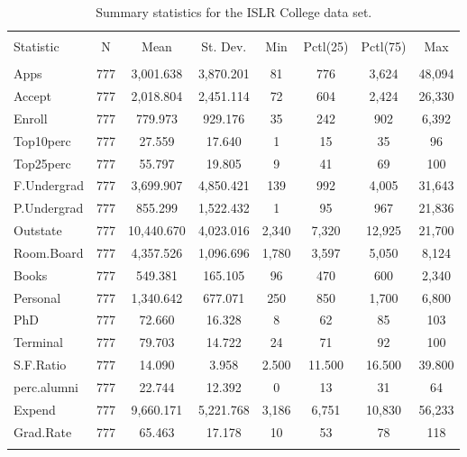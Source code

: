 \documentclass{article}\usepackage[]{graphicx}\usepackage[]{color}
\begin{document}
\begin{table}[!htbp] \centering 
  \caption{Summary statistics for the ISLR College data set.} 
  \label{descrips} 
\begin{tabular}{@{\extracolsep{5pt}}lccccccc} 
\\[-1.8ex]\hline 
\hline \\[-1.8ex] 
Statistic & \multicolumn{1}{c}{N} & \multicolumn{1}{c}{Mean} & \multicolumn{1}{c}{St. Dev.} & \multicolumn{1}{c}{Min} & \multicolumn{1}{c}{Pctl(25)} & \multicolumn{1}{c}{Pctl(75)} & \multicolumn{1}{c}{Max} \\ 
\hline \\[-1.8ex] 
Apps & 777 & 3,001.638 & 3,870.201 & 81 & 776 & 3,624 & 48,094 \\ 
Accept & 777 & 2,018.804 & 2,451.114 & 72 & 604 & 2,424 & 26,330 \\ 
Enroll & 777 & 779.973 & 929.176 & 35 & 242 & 902 & 6,392 \\ 
Top10perc & 777 & 27.559 & 17.640 & 1 & 15 & 35 & 96 \\ 
Top25perc & 777 & 55.797 & 19.805 & 9 & 41 & 69 & 100 \\ 
F.Undergrad & 777 & 3,699.907 & 4,850.421 & 139 & 992 & 4,005 & 31,643 \\ 
P.Undergrad & 777 & 855.299 & 1,522.432 & 1 & 95 & 967 & 21,836 \\ 
Outstate & 777 & 10,440.670 & 4,023.016 & 2,340 & 7,320 & 12,925 & 21,700 \\ 
Room.Board & 777 & 4,357.526 & 1,096.696 & 1,780 & 3,597 & 5,050 & 8,124 \\ 
Books & 777 & 549.381 & 165.105 & 96 & 470 & 600 & 2,340 \\ 
Personal & 777 & 1,340.642 & 677.071 & 250 & 850 & 1,700 & 6,800 \\ 
PhD & 777 & 72.660 & 16.328 & 8 & 62 & 85 & 103 \\ 
Terminal & 777 & 79.703 & 14.722 & 24 & 71 & 92 & 100 \\ 
S.F.Ratio & 777 & 14.090 & 3.958 & 2.500 & 11.500 & 16.500 & 39.800 \\ 
perc.alumni & 777 & 22.744 & 12.392 & 0 & 13 & 31 & 64 \\ 
Expend & 777 & 9,660.171 & 5,221.768 & 3,186 & 6,751 & 10,830 & 56,233 \\ 
Grad.Rate & 777 & 65.463 & 17.178 & 10 & 53 & 78 & 118 \\ 
\hline \\[-1.8ex] 
\end{tabular} 
\end{table} 
\end{document}
